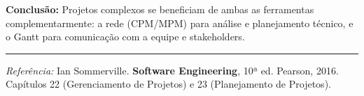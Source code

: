 \documentclass[12pt,a4paper]{article}
\begin{document}
\begin{resposta}
\textbf{Conclusão:} Projetos complexos se beneficiam de ambas as ferramentas
complementarmente: a rede (CPM/MPM) para análise e planejamento técnico, e
o Gantt para comunicação com a equipe e stakeholders.
\end{resposta}

\vspace{8pt}\hrule\vspace{6pt}
\begin{center}
  {\small \textit{Referência:} Ian Sommerville.
  \textbf{Software Engineering}, 10ª ed. Pearson, 2016.
  Capítulos 22 (Gerenciamento de Projetos) e 23 (Planejamento de Projetos).}
\end{center}
\end{document}
